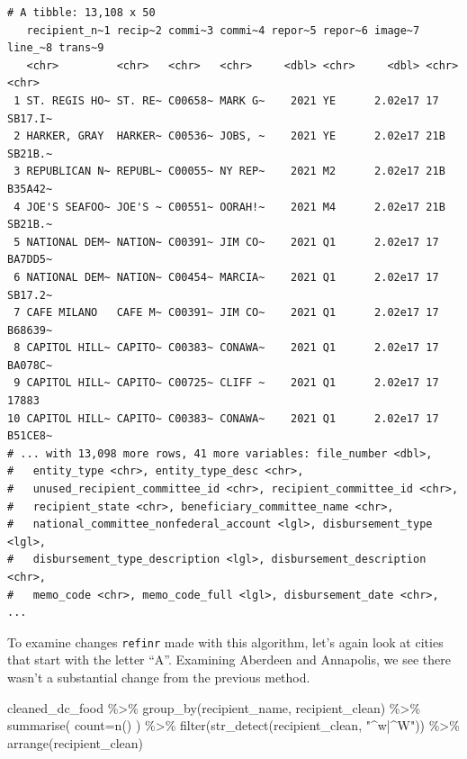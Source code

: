\documentclass[
  letterpaper,
  DIV=11,
  numbers=noendperiod]{scrreprt}
\newenvironment{Shaded}{\begin{snugshade}}{\end{snugshade}}
\newcommand{\AttributeTok}[1]{\textcolor[rgb]{0.40,0.45,0.13}{#1}}
\newcommand{\FunctionTok}[1]{\textcolor[rgb]{0.28,0.35,0.67}{#1}}
\newcommand{\NormalTok}[1]{\textcolor[rgb]{0.00,0.23,0.31}{#1}}
\newcommand{\SpecialCharTok}[1]{\textcolor[rgb]{0.37,0.37,0.37}{#1}}
\newcommand{\StringTok}[1]{\textcolor[rgb]{0.13,0.47,0.30}{#1}}
\begin{document}
\begin{verbatim}
# A tibble: 13,108 x 50
   recipient_n~1 recip~2 commi~3 commi~4 repor~5 repor~6 image~7 line_~8 trans~9
   <chr>         <chr>   <chr>   <chr>     <dbl> <chr>     <dbl> <chr>   <chr>  
 1 ST. REGIS HO~ ST. RE~ C00658~ MARK G~    2021 YE      2.02e17 17      SB17.I~
 2 HARKER, GRAY  HARKER~ C00536~ JOBS, ~    2021 YE      2.02e17 21B     SB21B.~
 3 REPUBLICAN N~ REPUBL~ C00055~ NY REP~    2021 M2      2.02e17 21B     B35A42~
 4 JOE'S SEAFOO~ JOE'S ~ C00551~ OORAH!~    2021 M4      2.02e17 21B     SB21B.~
 5 NATIONAL DEM~ NATION~ C00391~ JIM CO~    2021 Q1      2.02e17 17      BA7DD5~
 6 NATIONAL DEM~ NATION~ C00454~ MARCIA~    2021 Q1      2.02e17 17      SB17.2~
 7 CAFE MILANO   CAFE M~ C00391~ JIM CO~    2021 Q1      2.02e17 17      B68639~
 8 CAPITOL HILL~ CAPITO~ C00383~ CONAWA~    2021 Q1      2.02e17 17      BA078C~
 9 CAPITOL HILL~ CAPITO~ C00725~ CLIFF ~    2021 Q1      2.02e17 17      17883  
10 CAPITOL HILL~ CAPITO~ C00383~ CONAWA~    2021 Q1      2.02e17 17      B51CE8~
# ... with 13,098 more rows, 41 more variables: file_number <dbl>,
#   entity_type <chr>, entity_type_desc <chr>,
#   unused_recipient_committee_id <chr>, recipient_committee_id <chr>,
#   recipient_state <chr>, beneficiary_committee_name <chr>,
#   national_committee_nonfederal_account <lgl>, disbursement_type <lgl>,
#   disbursement_type_description <lgl>, disbursement_description <chr>,
#   memo_code <chr>, memo_code_full <lgl>, disbursement_date <chr>, ...
\end{verbatim}

To examine changes \texttt{refinr} made with this algorithm, let's again
look at cities that start with the letter ``A''. Examining Aberdeen and
Annapolis, we see there wasn't a substantial change from the previous
method.

\begin{Shaded}
\begin{Highlighting}[]
\NormalTok{cleaned\_dc\_food }\SpecialCharTok{\%\textgreater{}\%}
  \FunctionTok{group\_by}\NormalTok{(recipient\_name, recipient\_clean) }\SpecialCharTok{\%\textgreater{}\%}
  \FunctionTok{summarise}\NormalTok{(}
    \AttributeTok{count=}\FunctionTok{n}\NormalTok{()}
\NormalTok{  ) }\SpecialCharTok{\%\textgreater{}\%}
  \FunctionTok{filter}\NormalTok{(}\FunctionTok{str\_detect}\NormalTok{(recipient\_clean, }\StringTok{"\^{}w|\^{}W"}\NormalTok{)) }\SpecialCharTok{\%\textgreater{}\%}
  \FunctionTok{arrange}\NormalTok{(recipient\_clean)}
\end{Highlighting}
\end{Shaded}
\end{document}
